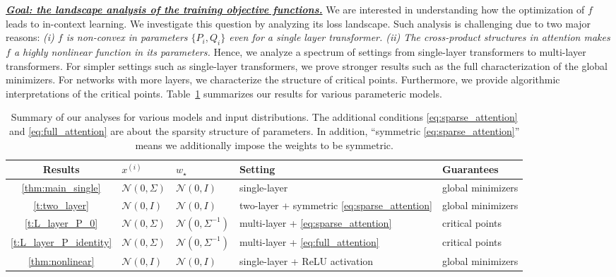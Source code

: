 \documentclass{article}
\newcommand{\N}{\mathcal{N}}
\newcommand{\wstar}{w_\star}
\newcommand{\tx}[1]{x^{(#1)}}
\newcommand{\emphh}[1]{\textbf{\emph{#1}}}
\begin{document}
\emphh{\underline{Goal: the landscape analysis of the training objective functions.}}
We are interested in understanding how the optimization of $f$ leads to in-context learning. We investigate this question by analyzing its loss landscape.
Such analysis is challenging due to two major reasons: \emph{(i) $f$ is non-convex in parameters $\{ P_i, Q_i\}$ even for a single layer transformer.
(ii) The cross-product structures in attention makes $f$ a highly nonlinear function in its parameters. }
Hence, we analyze a spectrum of settings from single-layer transformers to multi-layer transformers. For simpler settings such as single-layer transformers, we prove stronger results such as the full characterization of the global minimizers. For networks with more layers, we characterize the structure of critical points. Furthermore, we provide algorithmic interpretations of the critical points. Table~\ref{tab:summary} summarizes our results for various parameteric models. 

\begin{table}[h!]
\centering
\begin{tabular}{c|l l l l}
Results  & $\tx{i}$& $\wstar$ &  Setting & Guarantees \\
\hline
\hline
\autoref{thm:main_single} & $\N(0,\Sigma)$ & $\N(0,I)$ & single-layer & global minimizers \\
\autoref{t:two_layer} & $\N(0,I)$ & $\N(0,I)$ & two-layer +  symmetric \eqref{eq:sparse_attention}   & global minimizers \\
\autoref{t:L_layer_P_0} & $\N(0,\Sigma)$ & $\N(0,\Sigma^{-1})$ & multi-layer + \eqref{eq:sparse_attention}   & critical points \\
\autoref{t:L_layer_P_identity} & $\N(0,\Sigma)$ & $\N(0,\Sigma^{-1})$ & multi-layer +    \eqref{eq:full_attention} & critical points \\
\autoref{thm:nonlinear} & $\N(0,I)$ & $\N(0,I)$ & single-layer +  ReLU activation & global minimizers  \\
\hline
\hline
\end{tabular}
\vspace{5pt}
\caption{Summary of our analyses for various models and input distributions. The additional conditions \eqref{eq:sparse_attention} and  \eqref{eq:full_attention} are about the sparsity structure of parameters. In addition, ``symmetric \eqref{eq:sparse_attention}'' means we additionally impose the weights to be symmetric.}
\label{tab:summary}
\end{table}
\end{document}
